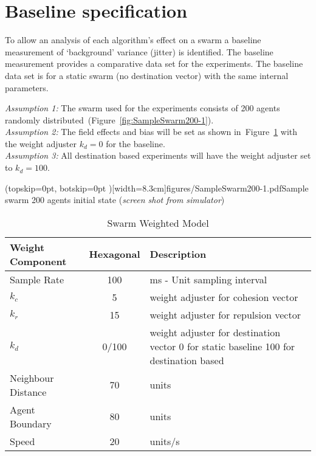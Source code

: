\documentclass{ieeeaccess}
\begin{document}
\section{Baseline specification}
To allow an analysis of each algorithm's effect on a swarm a baseline measurement of `background' variance (jitter) is identified. The baseline measurement provides a comparative data set for the experiments. The baseline data set is for a static swarm (no destination vector) with the same internal parameters.

\noindent\textit{Assumption 1:} The swarm used for the experiments consists of 200 agents randomly distributed~(Figure~\ref{fig:SampleSwarm200-1}).\\ 
\textit{Assumption 2:} The field effects and bias will be set as shown in~Figure~\ref{tab:DynamicPhysics1} with the weight adjuster $k_d = 0$ for the baseline.\\
\textit{Assumption 3:} All destination based experiments will have the weight adjuster set to $k_d = 100$.


\Figure[t!](topskip=0pt, botskip=0pt )[width=8.3cm]{figures/SampleSwarm200-1.pdf}{Sample swarm 200 agents initial state (\textit{screen shot from simulator})\label{fig:SampleSwarm200-1}}

\begin{table}
\begin{center}
\begin{tabular}{| p{1.5cm} | c | p{3.5cm} |}
\hline
\bf Weight \bf Component & \bf Hexagonal & \bf Description \\ \hline
Sample Rate & 100 & ms - Unit sampling interval\\  \hline
$k_c$ & 5 & weight adjuster for cohesion vector\\  \hline
$k_r$ & 15 & weight adjuster for repulsion  vector\\  \hline
$k_d$ & 0/100 & weight adjuster for destination vector 0 for static baseline 100 for destination based\\  \hline
Neighbour Distance & 70 & units\\  \hline
Agent Boundary & 80 & units\\  \hline
Speed & 20 & units/s\\  \hline
\end{tabular}\caption{Swarm Weighted Model} \label{tab:DynamicPhysics1}
\end{center}
\end{table}
\end{document}
